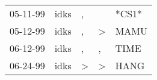 \begin{supertabular}{p{0.07\textwidth}p{0.06\textwidth}p{0.02\textwidth}p{0.02\textwidth}p{0.06\textwidth}}
 05-11-99\textsuperscript{} &  idks\textsuperscript{} &             , &               &                   *CS1* \\
 05-12-99\textsuperscript{} &  idks\textsuperscript{} &             , &  \textgreater &  MAMU\textsuperscript{} \\
 06-12-99\textsuperscript{} &  idks\textsuperscript{} &             , &             , &  TIME\textsuperscript{} \\
 06-24-99\textsuperscript{} &  idks\textsuperscript{} &  \textgreater &  \textgreater &  HANG\textsuperscript{} \\
\end{supertabular}
